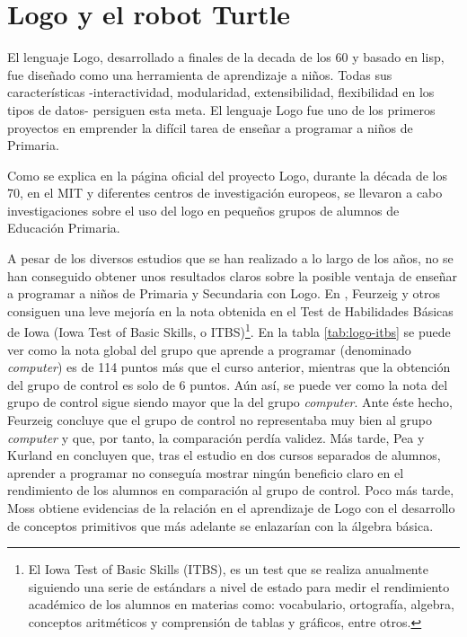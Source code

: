\section{Logo y el robot Turtle}
\label{sec:Logo}

El lenguaje Logo, desarrollado a finales de la decada de los 60 y basado en \Gls{lisp}, fue diseñado como una herramienta de aprendizaje a niños. Todas sus características -interactividad, modularidad, extensibilidad, flexibilidad en los tipos de datos- persiguen esta meta. El lenguaje Logo fue uno de los primeros proyectos en emprender la difícil tarea de enseñar a programar a niños de Primaria.


Como se explica en la página oficial del proyecto Logo\cite{logo}, durante la década de los 70, en el \acrfull{MIT} y diferentes centros de investigación europeos, se llevaron a cabo investigaciones sobre el uso del \Gls{logo} en pequeños grupos de alumnos de Educación Primaria.

A pesar de los diversos estudios que se han realizado a lo largo de los años, no se han conseguido obtener unos resultados claros sobre la posible ventaja de enseñar a programar a niños de Primaria y Secundaria con Logo. En \cite{feurzeig1969programming}, Feurzeig y otros consiguen una leve mejoría en la nota obtenida en el Test de Habilidades Básicas de Iowa (Iowa Test of Basic Skills, o ITBS)\footnote{El Iowa Test of Basic Skills (ITBS), es un test que se realiza anualmente siguiendo una serie de estándars a nivel de estado para medir el rendimiento académico de los alumnos en materias como: vocabulario, ortografía, algebra, conceptos aritméticos y comprensión de tablas y gráficos, entre otros.}. En la tabla \ref{tab:logo-itbs} se puede ver como la nota global del grupo que aprende a programar (denominado \emph{computer}) es de 114 puntos más que el curso anterior, mientras que la obtención del grupo de control es solo de 6 puntos. Aún así, se puede ver como la nota del grupo de control sigue siendo mayor que la del grupo \emph{computer}. Ante éste hecho, Feurzeig concluye que el grupo de control no representaba muy bien al grupo \emph{computer} y que, por tanto, la comparación perdía validez.
Más tarde, Pea y Kurland en \cite{pea1984logo} concluyen que, tras el estudio en dos cursos separados de alumnos, aprender a programar no conseguía mostrar ningún beneficio claro en el rendimiento de los alumnos en comparación al grupo de control.
Poco más tarde, Moss \cite{moss1985creating} obtiene evidencias de la relación en el aprendizaje de Logo con el desarrollo de conceptos primitivos que más adelante se enlazarían con la álgebra básica.


